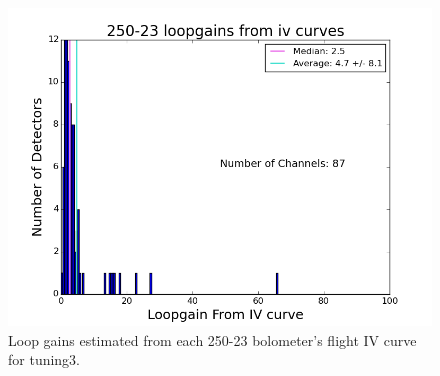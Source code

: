 \begin{figure}[htbp]
\begin{center}
\includegraphics[width=0.5 \textwidth]{figures/250-23_loopgains_from_iv_tuning3.png}
\caption{Loop gains estimated from each 250-23 bolometer's flight IV curve for tuning3.}
\label{fig:loopgain_from_iv_hist}
\end{center}
\end{figure}


